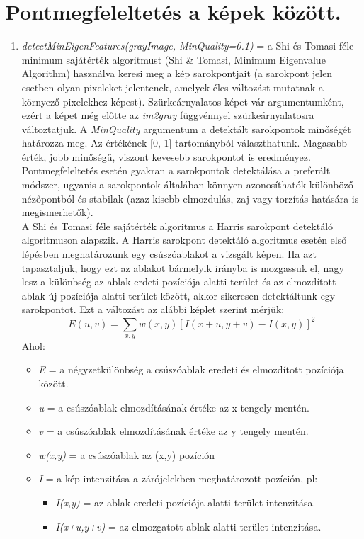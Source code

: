 \documentclass[12pt]{report}
\begin{document}
            \section{Pontmegfeleltetés a képek között.}
                \begin{enumerate}
                    \item \textit{detectMinEigenFeatures(grayImage, MinQuality=0.1)} = a Shi és Tomasi féle minimum sajátérték algoritmust (Shi \& Tomasi, Minimum Eigenvalue Algorithm) használva keresi meg a kép sarokpontjait (a sarokpont jelen esetben olyan pixeleket jelentenek, amelyek éles változást mutatnak a környező pixelekhez képest). Szürkeárnyalatos képet vár argumentumként, ezért a képet még előtte az \textit{im2gray} függvénnyel szürkeárnyalatosra változtatjuk. A \textit{MinQuality} argumentum a detektált sarokpontok minőségét határozza meg. Az értékének [0, 1] tartományból választhatunk. Magasabb érték, jobb minőségű, viszont kevesebb sarokpontot is eredményez.
                    Pontmegfeleltetés esetén gyakran a sarokpontok detektálása a preferált módszer, ugyanis a sarokpontok általában könnyen azonosíthatók különböző nézőpontból és stabilak (azaz kisebb elmozdulás, zaj vagy torzítás hatására is megismerhetők).\\
                    A Shi és Tomasi féle sajátérték algoritmus a Harris sarokpont detektáló algoritmuson alapszik. A Harris sarokpont detektáló algoritmus esetén első lépésben meghatározunk egy csúszóablakot a vizsgált képen. Ha azt tapasztaljuk, hogy ezt az ablakot bármelyik irányba is mozgassuk el, nagy lesz a különbség az ablak erdeti pozíciója alatti terület és az elmozdított ablak új pozíciója alatti terület között, akkor sikeresen detektáltunk egy sarokpontot. Ezt a változást az alábbi képlet szerint mérjük:
                    \[E(u,v) = \sum_{x,y}w(x,y)[I(x+u,y+v) - I(x,y)]^2\]
                    Ahol:\\ 
                    \begin{itemize}
                        \item \textit{E} = a négyzetkülönbség a csúszóablak eredeti és elmozdított pozíciója között.
                        \item \textit{u} = a csúszóablak elmozdításának értéke az x tengely mentén.
                        \item \textit{v} = a csúszóablak elmozdításának értéke az y tengely mentén.
                        \item \textit{w(x,y)} = a csúszóablak az (x,y) pozíción
                        \item \textit{I} = a kép intenzitása a zárójelekben meghatározott pozíción, pl:
                            \begin{itemize}
                                \item \textit{I(x,y)} = az ablak eredeti pozíciója alatti terület intenzitása.
                                \item \textit{I(x+u,y+v)} = az elmozgatott ablak alatti terület intenzitása.
                            \end{itemize}
                    \end{itemize}
                \end{enumerate}
\end{document}
